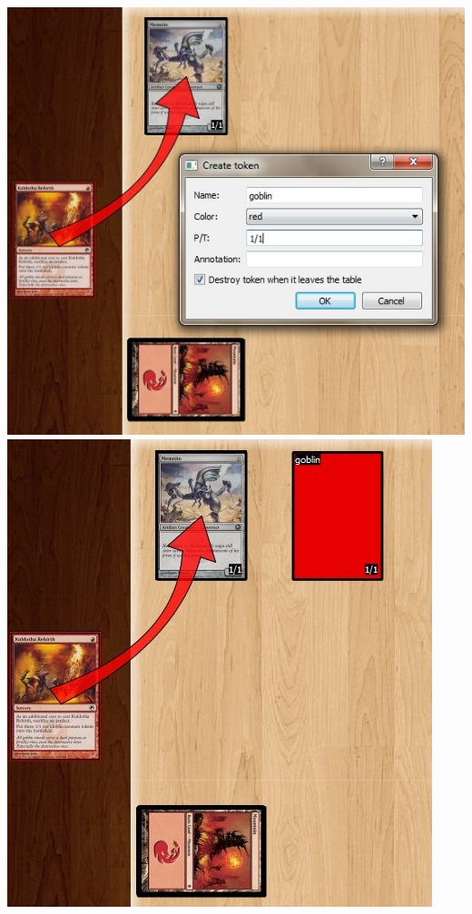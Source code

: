 \documentclass[a4paper]{scrbook}
\begin{document}
\begin{center}
\includegraphics[scale=0.5]{pics/fetche6b2} \\
\includegraphics[scale=0.5]{pics/fetch84a2}
\end{center}
\end{document}
